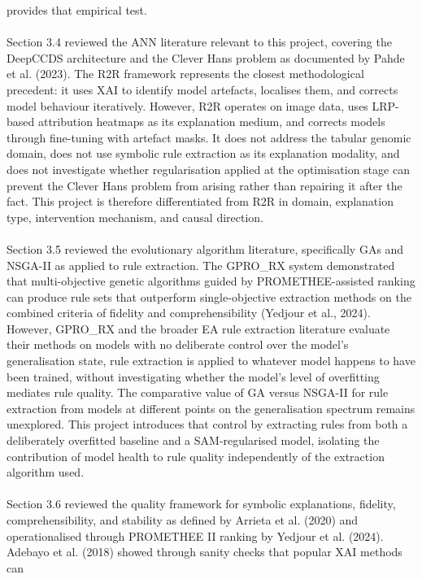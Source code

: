 provides that empirical test.
\\\\
Section 3.4 reviewed the ANN literature relevant to this project, covering the DeepCCDS architecture and the 
Clever Hans problem as documented by Pahde et al. (2023). The R2R framework represents the closest 
methodological precedent: it uses XAI to identify model artefacts, localises them, and corrects model behaviour 
iteratively. However, R2R operates on image data, uses LRP-based attribution heatmaps as its explanation medium, 
and corrects models through fine-tuning with artefact masks. It does not address the tabular genomic domain, 
does not use symbolic rule extraction as its explanation modality, and does not investigate whether 
regularisation applied at the optimisation stage can prevent the Clever Hans problem from arising rather than 
repairing it after the fact. This project is therefore differentiated from R2R in domain, explanation type, 
intervention mechanism, and causal direction.
\\\\
Section 3.5 reviewed the evolutionary algorithm literature, specifically GAs and NSGA-II as applied to rule 
extraction. The GPRO\_RX system demonstrated that multi-objective genetic algorithms guided by PROMETHEE-assisted 
ranking can produce rule sets that outperform single-objective extraction methods on the combined criteria of 
fidelity and comprehensibility (Yedjour et al., 2024). However, GPRO\_RX and the broader EA rule extraction 
literature evaluate their methods on models with no deliberate control over the model's generalisation state, 
rule extraction is applied to whatever model happens to have been trained, without investigating whether the 
model's level of overfitting mediates rule quality. The comparative value of GA versus NSGA-II for rule 
extraction from models at different points on the generalisation spectrum remains unexplored. This project 
introduces that control by extracting rules from both a deliberately overfitted baseline and a SAM-regularised 
model, isolating the contribution of model health to rule quality independently of the extraction algorithm used.
\\\\
Section 3.6 reviewed the quality framework for symbolic explanations, fidelity, comprehensibility, and 
stability as defined by Arrieta et al. (2020) and operationalised through PROMETHEE II ranking by 
Yedjour et al. (2024). Adebayo et al. (2018) showed through sanity checks that popular XAI methods can 
